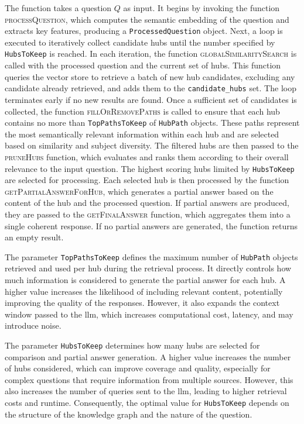 The function takes a question \(Q\) as input. It begins by invoking the function \textsc{processQuestion}, which computes the semantic embedding of the question and extracts key features, producing a \texttt{ProcessedQuestion} object. Next, a loop is executed to iteratively collect candidate hubs until the number specified by \texttt{HubsToKeep} is reached. In each iteration, the function \textsc{globalSimilaritySearch} is called with the processed question and the current set of hubs. This function queries the vector store to retrieve a batch of new hub candidates, excluding any candidate already retrieved, and adds them to the \texttt{candidate\_hubs} set. The loop terminates early if no new results are found. Once a sufficient set of candidates is collected, the function \textsc{fillOrRemovePaths} is called to ensure that each hub contains no more than \texttt{TopPathsToKeep} of \texttt{HubPath} objects. These paths represent the most semantically relevant information within each hub and are selected based on similarity and subject diversity. The filtered hubs are then passed to the \textsc{pruneHubs} function, which evaluates and ranks them according to their overall relevance to the input question. The highest scoring hubs limited by \texttt{HubsToKeep} are selected for processing. Each selected hub is then processed by the function \textsc{getPartialAnswerForHub}, which generates a partial answer based on the content of the hub and the processed question. If partial answers are produced, they are passed to the \textsc{getFinalAnswer} function, which aggregates them into a single coherent response. If no partial answers are generated, the function returns an empty result.


\begin{tcolorbox}[title=Parameter: \texttt{TopPathsToKeep}]
The parameter \texttt{TopPathsToKeep} defines the maximum number of \texttt{HubPath} objects retrieved and used per hub during the retrieval process. It directly controls how much information is considered to generate the partial answer for each hub. A higher value increases the likelihood of including relevant content, potentially improving the quality of the responses. However, it also expands the context window passed to the \gls{llm}, which increases computational cost, latency, and may introduce noise.
\end{tcolorbox}

\begin{tcolorbox}[title=Parameter: \texttt{HubsToKeep}]
The parameter \texttt{HubsToKeep} determines how many hubs are selected for comparison and partial answer generation. A higher value increases the number of hubs considered, which can improve coverage and quality, especially for complex questions that require information from multiple sources. However, this also increases the number of queries sent to the \gls{llm}, leading to higher retrieval costs and runtime. Consequently, the optimal value for \texttt{HubsToKeep} depends on the structure of the knowledge graph and the nature of the question.
\end{tcolorbox}
    
